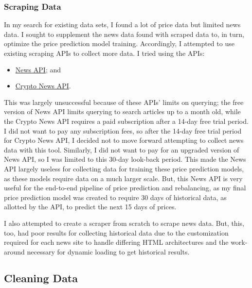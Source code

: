 \documentclass[10pt,twocolumn]{article}
\begin{document}
\subsubsection{Scraping Data}

In my search for existing data sets, I found a lot of price data but limited news data. I sought to supplement the news data found with scraped data to, in turn, optimize the price prediction model training. Accordingly, I attempted to use existing scraping APIs to collect more data. I tried using the APIs:

\begin{itemize}
    \item \href{https://newsapi.org}{News API}; and
    \item \href{https://cryptonews-api.com}{Crypto News API}.
\end{itemize}

\noindent This was largely unsuccessful because of these APIs' limits on querying; the free version of News API limits querying to search articles up to a month old, while the Crypto News API requires a paid subscription after a 14-day free trial period. I did not want to pay any subscription fees, so after the 14-day free trial period for Crypto News API, I decided not to move forward attempting to collect news data with this tool. Similarly, I did not want to pay for an upgraded version of News API, so I was limited to this 30-day look-back period. This made the News API largely useless for collecting data for training these price prediction models, as these models require data on a much larger scale. But, this News API is very useful for the end-to-end pipeline of price prediction and rebalancing, as my final price prediction model was created to require 30 days of historical data, as allotted by the API, to predict the next 15 days of prices.

I also attempted to create a scraper from scratch to scrape news data. But, this, too, had poor results for collecting historical data due to the customization required for each news site to handle differing HTML architectures and the work-around necessary for dynamic loading to get historical results.

\subsection{Cleaning Data}
\end{document}
